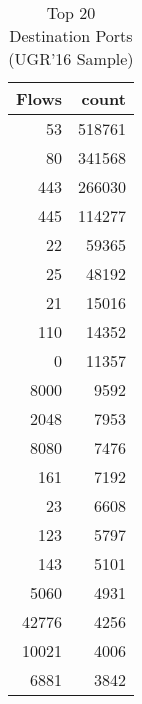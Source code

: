 \begin{table}
\caption{Top 20 Destination Ports (UGR'16 Sample)}
\label{tab:ugr16_top_ports}
\begin{tabular}{rr}
\toprule
Flows & count \\
\midrule
53 & 518761 \\
80 & 341568 \\
443 & 266030 \\
445 & 114277 \\
22 & 59365 \\
25 & 48192 \\
21 & 15016 \\
110 & 14352 \\
0 & 11357 \\
8000 & 9592 \\
2048 & 7953 \\
8080 & 7476 \\
161 & 7192 \\
23 & 6608 \\
123 & 5797 \\
143 & 5101 \\
5060 & 4931 \\
42776 & 4256 \\
10021 & 4006 \\
6881 & 3842 \\
\bottomrule
\end{tabular}
\end{table}
